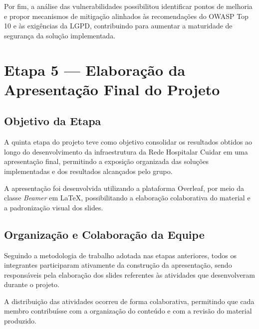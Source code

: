 \documentclass[12pt,a4paper,oneside]{report}
\begin{document}
Por fim, a análise das vulnerabilidades possibilitou identificar pontos de melhoria e propor mecanismos de mitigação alinhados às recomendações do OWASP Top 10 e às exigências da LGPD, contribuindo para aumentar a maturidade de segurança da solução implementada.




\chapter{Etapa 5 --- Elaboração da Apresentação Final do Projeto}

\section{Objetivo da Etapa}

A quinta etapa do projeto teve como objetivo consolidar os resultados obtidos ao longo do desenvolvimento da infraestrutura da Rede Hospitalar Cuidar em uma apresentação final, permitindo a exposição organizada das soluções implementadas e dos resultados alcançados pelo grupo.

A apresentação foi desenvolvida utilizando a plataforma Overleaf, por meio da classe \textit{Beamer} em \LaTeX, possibilitando a elaboração colaborativa do material e a padronização visual dos slides.

\section{Organização e Colaboração da Equipe}

Seguindo a metodologia de trabalho adotada nas etapas anteriores, todos os integrantes participaram ativamente da construção da apresentação, sendo responsáveis pela elaboração dos slides referentes às atividades que desenvolveram durante o projeto.

A distribuição das atividades ocorreu de forma colaborativa, permitindo que cada membro contribuísse com a organização do conteúdo e com a revisão do material produzido.
\end{document}
